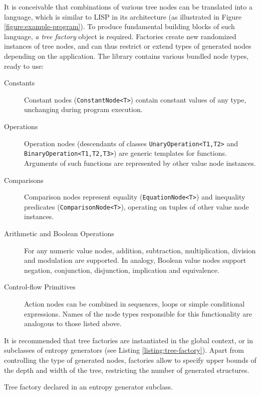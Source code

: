 It is conceivable that combinations of various tree nodes can be translated into a language, which is similar to LISP in its architecture (as illustrated in Figure \ref{figure:example-program}). To produce fundamental building blocks of such language, \textit{a tree factory} object is required. Factories create new randomized instances of tree nodes, and can thus restrict or extend types of generated nodes depending on the application. The library contains various bundled node types, ready to use:
~
\begin{description} 
	\item[Constants]
	Constant nodes (\texttt{ConstantNode<T>}) contain constant values of any type, unchanging during program execution.

	\item[Operations]
	Operation nodes (descendants of classes \texttt{UnaryOperation<T1,T2>} and \texttt{BinaryOperation<T1,T2,T3>}) are generic templates for functions. Arguments of such functions are represented by other value node instances.

	\item[Comparisons]
	Comparison nodes represent equality (\texttt{EquationNode<T>}) and inequality predicates (\texttt{ComparisonNode<T>}), operating on tuples of other value node instances.

	\item[Arithmetic and Boolean Operations]
	For any numeric value nodes, addition, subtraction, multiplication, division and modulation are supported. In analogy, Boolean value nodes support negation, conjunction, disjunction, implication and equivalence.

	\item[Control-flow Primitives]
	Action nodes can be combined in sequences, loops or simple conditional expressions. Names of the node types responsible for this functionality are analogous to those listed above.
\end{description}

It is recommended that tree factories are instantiated in the global context, or in subclasses of entropy generators (see Listing \ref{listing:tree-factory}). Apart from controlling the type of generated nodes, factories allow to specify upper bounds of the depth and width of the tree, restricting the number of generated structures.

\begin{listing}[ht]
	\caption{Tree factory declared in an entropy generator subclass.}
	\label{listing:tree-factory}
\end{listing}

